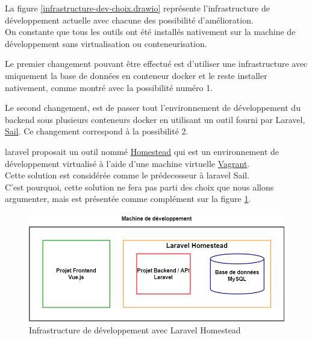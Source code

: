 \documentclass[
    iai, %
    il, %
]{heig-tb}
\begin{document}
La figure \ref{infrastructure-dev-choix.drawio} représente l'infrastructure de développement actuelle avec chacune des possibilité d'amélioration. \\
On constante que tous les outils ont été installés nativement sur la machine de développement sans virtualisation ou conteneurisation.

Le premier changement pouvant être effectué est d'utiliser une infrastructure avec uniquement la base de données en \Gls{conteneur} \Gls{docker} et le reste installer nativement, comme montré avec la possibilité numéro 1.

Le second changement, est de passer tout l'environnement de développement du \Gls{backend} sous plusieurs \Gls{conteneur}s \Gls{docker} en utilisant un outil fourni par Laravel, \href{https://laravel.com/docs/9.x/sail}{Sail}. Ce changement correspond à la possibilité 2.

\Gls{laravel} proposait un outil nommé \href{https://laravel.com/docs/9.x/homestead}{Homestead} qui est un environnement de développement virtualisé à l'aide d'une machine virtuelle \href{https://www.vagrantup.com/}{Vagrant}. \\
Cette solution est considérée comme le prédecesseur à \Gls{laravel} Sail.\\
C'est pourquoi, cette solution ne fera pas parti des choix que nous allons argumenter, mais est
présentée comme complément sur la figure \ref{infrastructure-dev-laravel-homestead.drawio}.


\begin{center}
    \begin{figure}[H]
        \includegraphics[width=\textwidth]{./assets/figures/infrastructure-dev-laravel-homestead.drawio.png}
        \caption{Infrastructure de développement avec Laravel Homestead \label{infrastructure-dev-laravel-homestead.drawio}}
    \end{figure}
\end{center}
\end{document}
